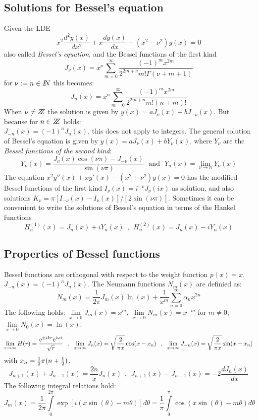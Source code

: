 \documentclass[a4paper,fancyheadings,twoside]{report}
\begin{document}
\subsection{Solutions for Bessel's equation}
Given the LDE
\[
x^2\frac{d^2y(x)}{dx^2}+x\frac{dy(x)}{dx}+(x^2-\nu^2)y(x)=0
\]
also called {\it Bessel's equation}, and the Bessel functions of the first
kind
\[
J_\nu(x)=x^\nu\sum_{m=0}^\infty\frac{(-1)^mx^{2m}}{2^{2m+\nu}m!\Gamma(\nu+m+1)}
\]
for $\nu:=n\in I\hspace{-1mm}N$ this becomes:
\[
J_n(x)=x^n\sum_{m=0}^\infty\frac{(-1)^mx^{2m}}{2^{2m+n}m!(n+m)!}
\]
When $\nu\neq Z\hspace{-1ex}Z$ the solution is given by $y(x)=aJ_\nu(x)+bJ_{-\nu}(x)$.
But because for $n\in Z\hspace{-1ex}Z$ holds:\\ $J_{-n}(x)=(-1)^nJ_n(x)$, this does not
apply to integers. The general solution of Bessel's equation is given by
$y(x)=aJ_\nu(x)+bY_\nu(x)$, where $Y_\nu$ are the {\it Bessel functions of the
second kind}:
\[
Y_\nu(x)=\frac{J_\nu(x)\cos(\nu\pi)-J_{-\nu}(x)}{\sin(\nu\pi)}~~~\mbox{and}~~~
Y_n(x)=\lim_{\nu\rightarrow n}Y_\nu(x)
\]
The equation $x^2y''(x)+xy'(x)-(x^2+\nu^2)y(x)=0$ has the modified
Bessel functions of the first kind $I_\nu(x)=i^{-\nu}J_\nu(ix)$ as solution,
and also solutions $K_\nu=\pi[I_{-\nu}(x)-I_\nu(x)]/[2\sin(\nu\pi)]$.
\npar
Sometimes it can be convenient to write the solutions of Bessel's equation in
terms of the Hankel functions
\[
H^{(1)}_n(x)=J_n(x)+iY_n(x)~~,~~H^{(2)}_n(x)=J_n(x)-iY_n(x)
\]

\subsection{Properties of Bessel functions}
Bessel functions are orthogonal with respect to the weight function $p(x)=x$.
\npar
$J_{-n}(x)=(-1)^nJ_n(x)$. The Neumann functions $N_m(x)$ are definied as:
\[
N_m(x)=\frac{1}{2\pi}J_m(x)\ln(x)+\frac{1}{x^m}\sum_{n=0}^\infty \alpha_nx^{2n}
\]
The following holds: $\lim\limits_{x\rightarrow0}J_m(x)=x^m$,
$\lim\limits_{x\rightarrow0}N_m(x)=x^{-m}$ for $m\neq0$,
$\lim\limits_{x\rightarrow0}N_0(x)=\ln(x)$.
\[
\lim_{r\rightarrow\infty}H(r)=\frac{{\rm e}^{\pm ikr}{\rm e}^{i\omega t}}{\sqrt{r}}~~,~~
\lim_{x\rightarrow\infty}J_n(x)=\sqrt{\frac{2}{\pi x}}\cos(x-x_n)~~,~~
\lim_{x\rightarrow\infty}J_{-n}(x)=\sqrt{\frac{2}{\pi x}}\sin(x-x_n)
\]
with $x_n=\mbox{$\frac{1}{2}$}\pi(n+\mbox{$\frac{1}{2}$})$.
\[
J_{n+1}(x)+J_{n-1}(x)=\frac{2n}{x}J_n(x)~~,~~J_{n+1}(x)-J_{n-1}(x)=-2\frac{dJ_n(x)}{dx}
\]
The following integral relations hold:
\[
J_m(x)=\frac{1}{2\pi}\int\limits_0^{2\pi}\exp[i(x\sin(\theta)-m\theta)]d\theta=
\frac{1}{\pi}\int\limits_0^\pi\cos(x\sin(\theta)-m\theta)d\theta
\]
\end{document}
